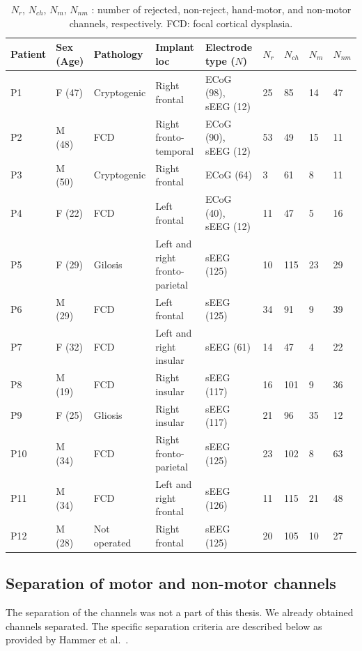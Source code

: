 \begin{table}[!htbp]
\centering
\begin{tabular}{|p{1.3cm}|p{1.05cm}|p{2.15cm}|p{2.2cm}|p{1.8cm}|p{0.5cm}|p{0.65cm}|p{0.6cm}|p{0.8cm}|}
\toprule
Patient&Sex (Age)&Pathology&Implant loc&Electrode type ($N$)& $N_r$ &$N_{ch}$&$N_{m}$&$N_{nm}$ \\
\hline
\midrule
P1 & F (47) & Cryptogenic & Right frontal & ECoG (98),  sEEG (12) & 25 & 85 & 14 & 47 \\
\hline
P2 & M (48) & FCD & Right fronto-temporal & ECoG (90), sEEG (12) & 53 & 49 & 15 & 11 \\
\hline
P3 & M (50) & Cryptogenic & Right frontal & ECoG (64) & 3 & 61 & 8 & 11 \\
\hline
P4 & F (22) & FCD & Left frontal & ECoG (40),  sEEG (12) & 11 & 47 & 5 & 16 \\
\hline
P5 & F (29) & Gilosis & Left and right fronto-parietal &  sEEG (125) & 10 & 115 & 23 & 29 \\
\hline
P6 & M (29) & FCD & Left frontal &  sEEG (125) & 34 & 91 & 9 & 39 \\
\hline
P7 & F (32) & FCD & Left and right insular &  sEEG (61) & 14 & 47 & 4 & 22 \\
\hline
P8 & M (19) & FCD & Right insular &  sEEG (117) & 16 & 101 & 9 & 36 \\
\hline
P9 & F (25) & Gliosis & Right insular &  sEEG (117) & 21 & 96 & 35 & 12 \\
\hline
P10 & M (34) & FCD & Right fronto-parietal &  sEEG (125) & 23 & 102 & 8 & 63 \\
\hline
P11 & M (34) & FCD & Left and right frontal &  sEEG (126) & 11 & 115 & 21 & 48 \\
\hline
P12 & M (28) & Not operated & Right frontal &  sEEG (125) & 20 & 105 & 10 & 27 \\
\bottomrule
\end{tabular}\label{tab:table}
\caption[Patient details]{$N_r$, $N_{ch}$, $N_{m}$, $N_{nm}$  : number of rejected, non-reject, hand-motor, and non-motor channels, respectively. FCD: focal cortical dysplasia.}
\label{tab:patient-table}
\end{table}

\subsection{Separation of motor and non-motor channels}\label{subsec:separation-of-motor-and-non-motor-channels}
The separation of the channels was not a part of this thesis. 
We already obtained channels separated.
The specific separation criteria are described below as provided by Hammer et al.~\cite{Hammer-2021}. \\

